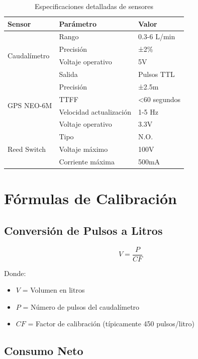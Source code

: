 \documentclass[12pt,a4paper,oneside]{report}
\begin{document}
\begin{table}[H]
    \centering
    \begin{tabular}{|l|l|l|}
        \hline
        \textbf{Sensor} & \textbf{Parámetro} & \textbf{Valor} \\
        \hline
        \multirow{4}{*}{Caudalímetro} & Rango & 0.3-6 L/min \\
        & Precisión & ±2\% \\
        & Voltaje operativo & 5V \\
        & Salida & Pulsos TTL \\
        \hline
        \multirow{4}{*}{GPS NEO-6M} & Precisión & ±2.5m \\
        & TTFF & <60 segundos \\
        & Velocidad actualización & 1-5 Hz \\
        & Voltaje operativo & 3.3V \\
        \hline
        \multirow{3}{*}{Reed Switch} & Tipo & N.O. \\
        & Voltaje máximo & 100V \\
        & Corriente máxima & 500mA \\
        \hline
    \end{tabular}
    \caption{Especificaciones detalladas de sensores}
\end{table}

\section{Fórmulas de Calibración}

\subsection{Conversión de Pulsos a Litros}

$$V = \frac{P}{CF}$$

Donde:
\begin{itemize}
    \item $V$ = Volumen en litros
    \item $P$ = Número de pulsos del caudalímetro
    \item $CF$ = Factor de calibración (típicamente 450 pulsos/litro)
\end{itemize}

\subsection{Consumo Neto}
\end{document}

